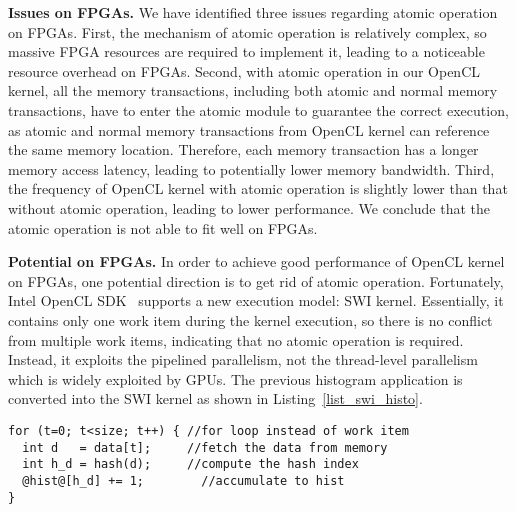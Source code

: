 
{\bf Issues on FPGAs. }We have identified three issues regarding atomic operation on FPGAs. First, the mechanism of atomic operation is relatively complex, so massive FPGA resources are required to implement it, leading to a noticeable resource overhead on FPGAs. %
Second, with atomic operation in our OpenCL kernel, all the memory transactions, including both atomic and normal memory transactions, have to enter the atomic module to guarantee the correct execution, as atomic and normal memory transactions from OpenCL kernel can reference the same memory location. Therefore, each memory transaction has a longer memory access latency, leading to potentially lower memory bandwidth.  
Third, the frequency of OpenCL kernel with atomic operation is slightly lower than that without atomic operation, leading to lower performance. We conclude that the atomic operation is not able to fit well on FPGAs.  %

{\bf Potential on FPGAs. }In order to achieve good performance of OpenCL kernel on FPGAs, one potential direction is to get rid of atomic operation. Fortunately, Intel OpenCL SDK~\cite{altera_optimization} supports a new execution model: SWI kernel. Essentially, it contains only one work item during the kernel execution, so there is no conflict from multiple work items, indicating that no atomic operation is required. Instead, it exploits the pipelined parallelism, not the thread-level parallelism which is widely exploited by GPUs. The previous histogram application is converted into the SWI kernel as shown in Listing~\ref{list_swi_histo}. 

\begin{lstlisting}[caption={SWI-based histogram},label={list_swi_histo},captionpos=b]
for (t=0; t<size; t++) { //for loop instead of work item
  int d   = data[t];     //fetch the data from memory
  int h_d = hash(d);     //compute the hash index
  @hist@[h_d] += 1;        //accumulate to hist
}
\end{lstlisting}


\vspace{-1ex}
